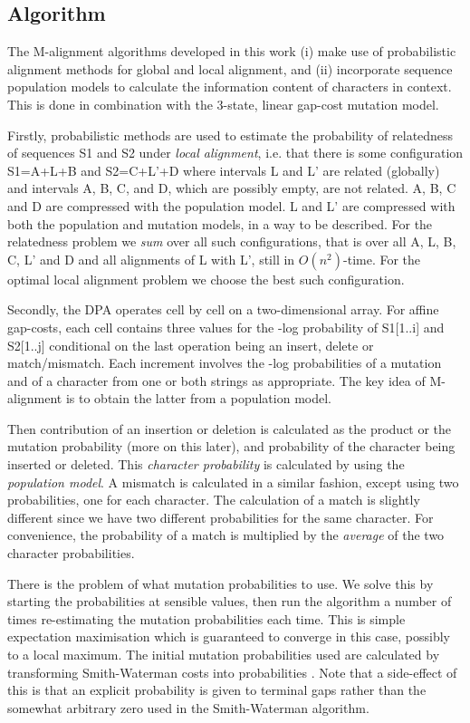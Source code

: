 \documentclass[letterpaper,11pt,oneside]{article}
\begin{document}
\begin{multicols}{2}
\section{Algorithm} \label{sec:alg}

The M-alignment algorithms developed in this work
(i) make use of probabilistic alignment methods
for global and local alignment, and
(ii) incorporate sequence population models to calculate
the information content of characters in context.
This is done in combination with the 3-state, linear gap-cost mutation model.

Firstly,
probabilistic methods are used to estimate the probability of relatedness
of sequences S1 and S2 under {\em local alignment}, i.e. that there is some
configuration S1=A+L+B and S2=C+L'+D where intervals L and L' are
related (globally) and intervals A, B, C, and D, which are possibly empty,
are not related.
A, B, C and D are compressed with the population model.
L and L' are compressed with both the population and mutation models,
in a way to be described.
For the relatedness problem we {\em sum} over all such configurations,
that is over all A, L, B, C, L' and D and all alignments of L with L',
still in $O(n^2)$-time.
For the optimal local alignment problem we choose the best such configuration.

Secondly,
the DPA operates cell by cell on a two-dimensional array.
For affine gap-costs, each cell contains three values for the -log probability
of S1[1..i] and S2[1..j] conditional on the last operation
being an insert, delete or match/mismatch.
Each increment involves the -log probabilities of a mutation and
of a character from one or both strings as appropriate.
The key idea of M-alignment is to obtain the latter from a population model.

Then contribution of an insertion or deletion is calculated as the product or
the mutation probability (more on this later), and probability of the
character being inserted or deleted.  This {\em character probability} is
calculated by using the {\em population model}.  A mismatch is calculated in a
similar fashion, except using two probabilities, one for each character.  The
calculation of a match is slightly different since we have two different
probabilities for the same character.  For convenience, the probability of a
match is multiplied by the {\em average} of the two character probabilities.

There is the problem of what mutation probabilities to use.  We solve this by
starting the probabilities at sensible values, then run the algorithm a number
of times re-estimating the mutation probabilities each time.  This is simple
expectation maximisation which is guaranteed to converge in this case,
possibly to a local maximum.  The initial mutation probabilities used are
calculated by transforming Smith-Waterman costs into probabilities
\cite{allison93a}.  Note that a side-effect of this is that an explicit
probability is given to terminal gaps rather than the somewhat arbitrary zero
used in the Smith-Waterman algorithm.


\end{multicols}
\end{document}
